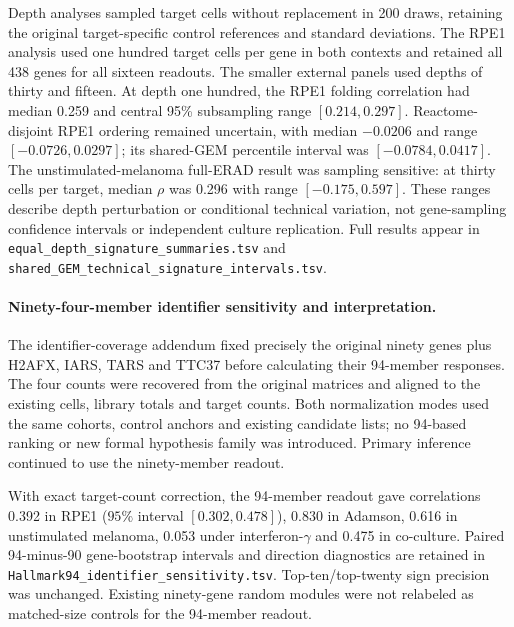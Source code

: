\documentclass[a4paper,fleqn]{cas-sc}
\makeatletter
\DeclareRobustCommand{\rev}[1]{{\color{red}\def\@citecolor{black}\def\@linkcolor{red}\def\@urlcolor{red}#1}}
\makeatother
\begin{document}
\rev{Depth analyses sampled target cells without replacement in 200 draws, retaining the original target-specific control references and standard deviations.} \rev{The RPE1 analysis used one hundred target cells per gene in both contexts and retained all 438 genes for all sixteen readouts.} \rev{The smaller external panels used depths of thirty and fifteen.} \rev{At depth one hundred, the RPE1 folding correlation had median 0.259 and central 95\% subsampling range $[0.214,0.297]$.} \rev{Reactome-disjoint RPE1 ordering remained uncertain, with median $-0.0206$ and range $[-0.0726,0.0297]$; its shared-GEM percentile interval was $[-0.0784,0.0417]$.} \rev{The unstimulated-melanoma full-ERAD result was sampling sensitive: at thirty cells per target, median $\rho$ was 0.296 with range $[-0.175,0.597]$.} \rev{These ranges describe depth perturbation or conditional technical variation, not gene-sampling confidence intervals or independent culture replication.} \rev{Full results appear in \nolinkurl{equal_depth_signature_summaries.tsv} and \nolinkurl{shared_GEM_technical_signature_intervals.tsv}.}

\paragraph{\rev{Ninety-four-member identifier sensitivity and interpretation.}}
\rev{The identifier-coverage addendum fixed precisely the original ninety genes plus H2AFX, IARS, TARS and TTC37 before calculating their 94-member responses.} \rev{The four counts were recovered from the original matrices and aligned to the existing cells, library totals and target counts.} \rev{Both normalization modes used the same cohorts, control anchors and existing candidate lists; no 94-based ranking or new formal hypothesis family was introduced.} \rev{Primary inference continued to use the ninety-member readout.}

\rev{With exact target-count correction, the 94-member readout gave correlations 0.392 in RPE1 ($95\%$ interval $[0.302,0.478]$), 0.830 in Adamson, 0.616 in unstimulated melanoma, 0.053 under interferon-$\gamma$ and 0.475 in co-culture.} \rev{Paired 94-minus-90 gene-bootstrap intervals and direction diagnostics are retained in \nolinkurl{Hallmark94_identifier_sensitivity.tsv}.} \rev{Top-ten/top-twenty sign precision was unchanged.} \rev{Existing ninety-gene random modules were not relabeled as matched-size controls for the 94-member readout.}
\end{document}
